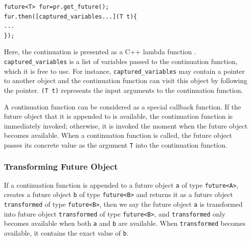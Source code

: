 \begin{lstlisting}[style=InlineStyle]
future<T> fur=pr.get_future();
fur.then([captured_variables...](T t){
...
});
\end{lstlisting}

\noindent Here, the continuation is presented as a C++ lambda function \cite{cpplambda}. \lstinline[style=InlineStyle]{captured_variables} is a list of variables passed to the continuation function, which it is free to use. For instance, \lstinline[style=InlineStyle]{captured_variables} may contain a pointer to another object and the continuation function can visit this object by following the pointer. %
 \lstinline[style=InlineStyle]{(T t)} represents the input arguments to the continuation function.

A continuation function can be considered as a special callback function. If the future object that it is appended to is available, the continuation function is immediately invoked; otherwise, it is invoked the moment when the future object becomes available. When a continuation function is called, the future object passes its concrete value as the argument \lstinline[style=InlineStyle]{T} into the continuation function. %

\subsubsection{Transforming Future Object}
\label{sec:tranform-future-object}

 If a continuation function is appended to a future object \lstinline[style=InlineStyle]{a} of type \lstinline[style=InlineStyle]{future<A>}, creates a future object \lstinline[style=InlineStyle]{b} of type \lstinline[style=InlineStyle]{future<B>} and returns it as a future object \lstinline[style=InlineStyle]{transformed} of type \lstinline[style=InlineStyle]{future<B>}, then we say the future object \lstinline[style=InlineStyle]{a} is transformed into future object \lstinline[style=InlineStyle]{transformed} of type \lstinline[style=InlineStyle]{future<B>}, and \lstinline[style=InlineStyle]{transformed} only becomes available when both \lstinline[style=InlineStyle]{a} and \lstinline[style=InlineStyle]{b} are available. %
When \lstinline[style=InlineStyle]{transformed} becomes available, it contains the exact value of \lstinline[style=InlineStyle]{b}. %

